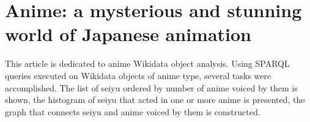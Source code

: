 
\chapter{Anime: a mysterious and stunning world of Japanese animation\protect\footnotemark}



This article is dedicated to anime Wikidata object analysis. Using SPARQL queries executed on Wikidata objects of anime type, several tasks were accomplished. The list of seiyu ordered by number of anime voiced by them is shown, the histogram of seiyu that acted in one or more anime is presented, the graph that connects seiyu and anime voiced by them is constructed.